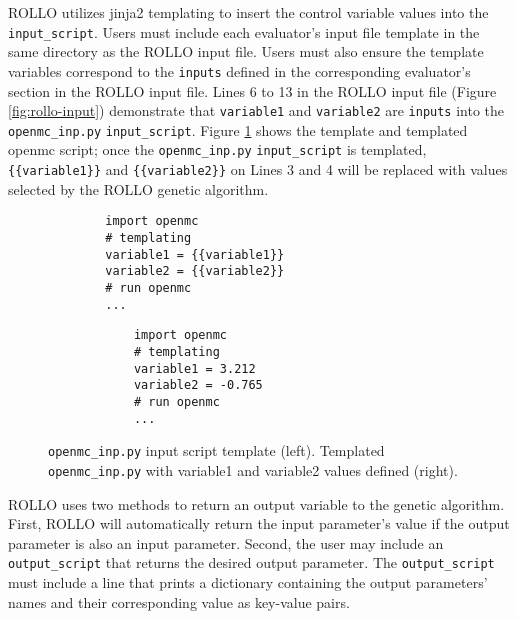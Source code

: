 \gls{ROLLO} utilizes jinja2 templating \cite{ronacher_welcome_2018} to insert 
the control variable values into the \texttt{input\_script}.
Users must include each evaluator's input file template in the same directory as the \gls{ROLLO} input 
file. 
Users must also ensure the template variables correspond to the \texttt{inputs} defined in the 
corresponding evaluator's section in the ROLLO input file. 
Lines 6 to 13 in the \gls{ROLLO} input file (Figure \ref{fig:rollo-input}) demonstrate 
that \texttt{variable1} and \texttt{variable2} are \texttt{inputs} into the 
\texttt{openmc\_inp.py} \texttt{input\_script}. 
Figure \ref{fig:openmcinp.py} shows the template and templated openmc script; 
once the \texttt{openmc\_inp.py} \texttt{input\_script} is templated, 
\texttt{\{\{variable1\}\}} and \texttt{\{\{variable2\}\}}  on Lines 3 and 4 will be 
replaced with values selected by the \gls{ROLLO} genetic algorithm. 
\begin{figure}[htbp]
    \begin{minipage}{0.4\textwidth}
        \centering
    \begin{verbatim}
        import openmc 
        # templating 
        variable1 = {{variable1}}
        variable2 = {{variable2}}
        # run openmc 
        ... 
    \end{verbatim}
    \end{minipage}
    \hspace{2cm}
    \begin{minipage}{0.4\textwidth}
        \centering
        \begin{verbatim}
            import openmc 
            # templating 
            variable1 = 3.212
            variable2 = -0.765
            # run openmc 
            ... 
        \end{verbatim}
        \end{minipage}
    \caption{\texttt{openmc\_inp.py} input script template (left). 
             Templated \texttt{openmc\_inp.py} with variable1 and variable2 
             values defined (right).}
    \label{fig:openmcinp.py}
\end{figure}

\gls{ROLLO} uses two methods to return an output variable to the genetic algorithm. 
First, \gls{ROLLO} will automatically return the input parameter's value if the output 
parameter is also an input parameter. 
Second, the user may include an \texttt{output\_script} that returns the desired 
output parameter. 
The \texttt{output\_script} must include a line that prints a dictionary containing 
the output parameters' names and their corresponding value as key-value pairs. 

